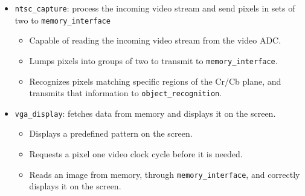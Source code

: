 \documentclass{article}
\begin{document}
\begin{itemize}
\item[] {\tt ntsc\_capture}: process the incoming video stream and send pixels in sets of two to {\tt memory\_interface}
	\begin{itemize}
	\item Capable of reading the incoming video stream from the video ADC.
	\item Lumps pixels into groups of two to transmit to {\tt memory\_interface}.
	\item Recognizes pixels matching specific regions of the Cr/Cb plane, and transmits that information to {\tt object\_recognition}.
	\end{itemize}

\item[] {\tt vga\_display}: fetches data from memory and displays it on the screen.
	\begin{itemize}
	\item Displays a predefined pattern on the screen.
	\item Requests a pixel one video clock cycle before it is needed.
	\item Reads an image from memory, through {\tt memory\_interface}, and correctly displays it on the screen.
	\end{itemize}

\end{itemize}
\end{document}
